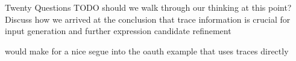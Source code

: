 \begin{frame}{Twenty Questions}
  TODO should we walk through our thinking at this point? Discuss how we arrived at the conclusion that trace information is crucial for input generation and further expression candidate refinement

  would make for a nice segue into the oauth example that uses traces directly
\end{frame}
